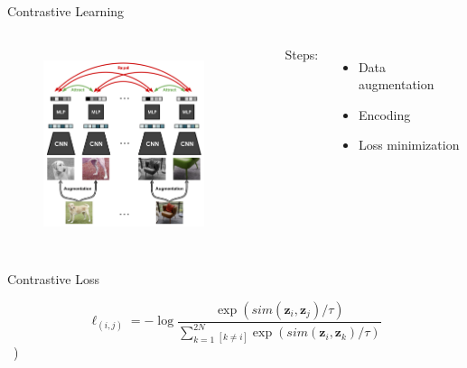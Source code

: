 \documentclass[xcolor=table]{beamer}
\begin{document}
\begin{frame}{Contrastive Learning}
	
	\begin{columns}

		\begin{figure}[htb]
      			\includegraphics[height=5cm]{figs/contrastive_learning.png}
      			\label{fig:simCLR}
		\end{figure}
		~\flushright \tiny \cite{chen2020}
	
  
		\pause
 
		Steps: \\
		\begin{itemize}
			\item Data augmentation
			\item Encoding
			\item Loss minimization
		\end{itemize}
	    
		\bigskip
	
	\end{columns}

\end{frame}

\begin{frame}{Contrastive Loss}
	
	\centering
	
	\begin{equation}
	\ell_{(i,j)}=-\log{\frac{\exp{\left(sim(\boldsymbol{z}_i,\boldsymbol{z}_j)/\tau\right)}}{\sum_{k=1}^{2N}\mathbf{}_{[k\neq i]}\exp{\left(sim(\boldsymbol{z}_i,\boldsymbol{z}_k)/\tau\right)}}}
	\end{equation}
	~\flushright \tiny \cite{chen2020})
\end{frame}
\end{document}
